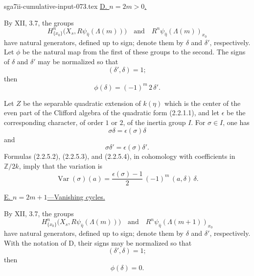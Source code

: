 \begin{filecontents*}{sga7ii-cumulative-input-073.tex}
\medskip
\noindent\underline{D. $n=2m>0$.}

By XII, 3.7, the groups
\[
H^n_{\{x_0\}}\bigl(X_s,R\psi_{\bar\eta}(\Lambda(m))\bigr)
\quad\text{and}\quad
R^n\psi_{\bar\eta}(\Lambda(m))_{x_0}
\]
have natural generators, defined up to sign; denote them by
$\delta$ and $\delta'$, respectively.  Let $\phi$ be the natural map
from the first of these groups to the second.  The signs of $\delta$
and $\delta'$ may be normalized so that
\begin{equation}\tag{2.2.5.2}
(\delta',\delta)=1;
\end{equation}
then
\begin{equation}\tag{2.2.5.3}
\phi(\delta)=(-1)^m\,2\,\delta'.
\end{equation}

Let $Z$ be the separable quadratic extension of $k(\eta)$ which is
the center of the even part of the Clifford algebra of the quadratic
form (2.2.1.1), and let $\epsilon$ be the corresponding character,
of order $1$ or $2$, of the inertia group $I$.  For $\sigma\in I$,
one has
\begin{equation}\tag{2.2.5.4}
\sigma\delta=\epsilon(\sigma)\delta
\end{equation}
and
\begin{equation}\tag{2.2.5.5}
\sigma\delta'=\epsilon(\sigma)\delta'.
\end{equation}
Formulas (2.2.5.2), (2.2.5.3), and (2.2.5.4), in cohomology with
coefficients in $\mathbb Z/2k$, imply that the variation is
\begin{equation}\tag{2.2.5.6}
\operatorname{Var}(\sigma)(a)=
\frac{\epsilon(\sigma)-1}{2}\,(-1)^m\,(a,\delta)\,\delta.
\end{equation}

\medskip
\noindent\underline{E. $n=2m+1$---Vanishing cycles.}

By XII, 3.7, the groups
\[
H^n_{\{x_0\}}\bigl(X_s,R\psi_{\bar\eta}(\Lambda(m))\bigr)
\quad\text{and}\quad
R^n\psi_{\bar\eta}(\Lambda(m+1))_{x_0}
\]
have natural generators, defined up to sign; denote them by
$\delta$ and $\delta'$, respectively.  With the notation of D, their
signs may be normalized so that
\begin{equation}\tag{2.2.5.7}
(\delta',\delta)=1;
\end{equation}
then
\begin{equation}\tag{2.2.5.8}
\phi(\delta)=0.
\end{equation}


\end{filecontents*}
